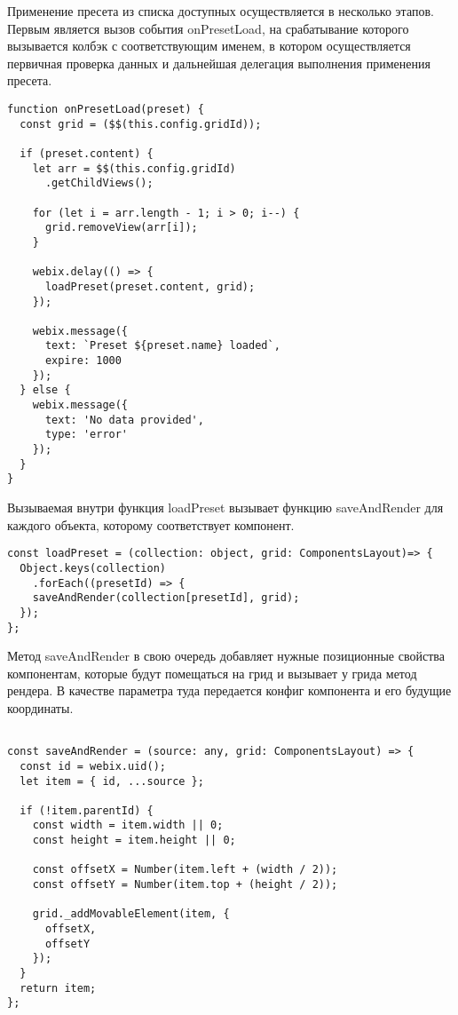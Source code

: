 Применение пресета из списка доступных осуществляется в несколько этапов. 
Первым является вызов события onPresetLoad, на срабатывание которого вызывается колбэк с соответствующим именем, в котором осуществляется первичная проверка данных и дальнейшая делегация выполнения применения пресета.

\begin{lstlisting}
function onPresetLoad(preset) {
  const grid = ($$(this.config.gridId));

  if (preset.content) {
    let arr = $$(this.config.gridId)
      .getChildViews();

    for (let i = arr.length - 1; i > 0; i--) {
      grid.removeView(arr[i]);
    }

    webix.delay(() => {
      loadPreset(preset.content, grid);
    });

    webix.message({
      text: `Preset ${preset.name} loaded`,
      expire: 1000
    });
  } else {
    webix.message({
      text: 'No data provided',
      type: 'error'
    });
  }
}
\end{lstlisting}

Вызываемая внутри функция loadPreset вызывает функцию saveAndRender для каждого объекта, которому соответствует компонент.

\begin{lstlisting}  
const loadPreset = (collection: object, grid: ComponentsLayout)=> {
  Object.keys(collection)
    .forEach((presetId) => {
    saveAndRender(collection[presetId], grid);
  });
};    
\end{lstlisting}

Метод saveAndRender в свою очередь добавляет нужные позиционные свойства компонентам, которые будут помещаться на грид и вызывает у грида метод рендера. В качестве параметра туда передается конфиг компонента и его будущие координаты.

\begin{lstlisting}
    
const saveAndRender = (source: any, grid: ComponentsLayout) => {
  const id = webix.uid();
  let item = { id, ...source };
  
  if (!item.parentId) {
    const width = item.width || 0;
    const height = item.height || 0;
  
    const offsetX = Number(item.left + (width / 2));
    const offsetY = Number(item.top + (height / 2));
  
    grid._addMovableElement(item, {
      offsetX,
      offsetY
    });
  }
  return item;
};
\end{lstlisting}

